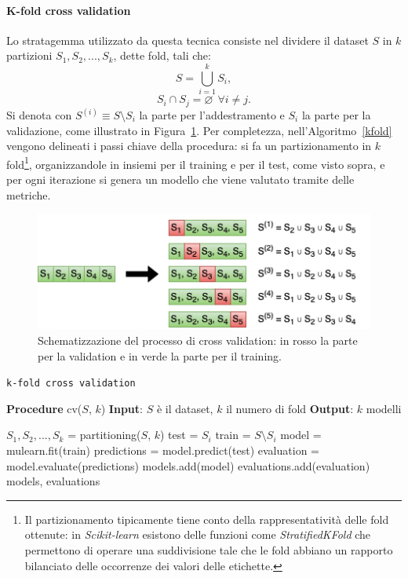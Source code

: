 \documentclass[12pt]{report}
\theoremstyle{definition}
\let\emptyset\varnothing
\begin{document}
\paragraph{K-fold cross validation}
Lo stratagemma utilizzato da questa tecnica consiste nel dividere il dataset $S$ in $k$ partizioni $S_1, S_2, ..., S_k$, dette fold, tali che:
\begin{equation}
     S = \bigcup\limits_{i=1}^{k} S_{i},
\end{equation}
\begin{equation}
    S_i \cap S_j = \emptyset \ \ \forall i \neq j.
\end{equation}
Si denota con $S^{(i)} \equiv S \setminus S_i$ la parte per l'addestramento e $S_i$ la parte per la validazione, come illustrato in Figura~\ref{cv}.
Per completezza, nell'Algoritmo~\ref{kfold} vengono delineati i passi chiave della procedura: si fa un partizionamento in $k$ fold\footnote{Il partizionamento tipicamente tiene conto della rappresentatività delle fold ottenute: in \textit{Scikit-learn} esistono delle funzioni come \textit{StratifiedKFold} che permettono di operare una suddivisione tale che le fold abbiano un rapporto bilanciato delle occorrenze dei valori delle etichette.}, organizzandole in insiemi per il training e per il test, come visto sopra, e per ogni iterazione si genera un modello che viene valutato tramite delle metriche.
\begin{figure}
    \centering
    \includegraphics[scale=0.83]{images/cv.png}
    \caption{Schematizzazione del processo di cross validation: in rosso la parte per la validation e in verde la parte per il training.}
    \label{cv}
\end{figure}
\begin{algorithm}
\caption{\texttt{k-fold cross validation}}
\label{kfold}
\hspace*{\algorithmicindent} \textbf{Procedure} cv($S$, $k$)
\newline
\hspace*{\algorithmicindent} \textbf{Input}: $S$ è il dataset, $k$ il numero di fold
\newline
\hspace*{\algorithmicindent} \textbf{Output}: $k$ modelli
\begin{algorithmic}[1]
\STATE $S_1, S_2, ..., S_k$ = partitioning($S$, $k$)
\STATE test = $S_i$
\STATE train = $S \setminus S_i$
\STATE model = mulearn.fit(train)
\STATE predictions = model.predict(test)
\STATE evaluation = model.evaluate(predictions)
\STATE models.add(model)
\STATE evaluations.add(evaluation)
\ENDFOR
\RETURN models, evaluations
\end{algorithmic}
\end{algorithm}
\end{document}
